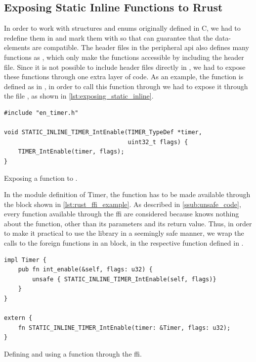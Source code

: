 \subsection{Exposing Static Inline Functions to Rrust}

In order to work with structures and enums originally defined in C, we had to redefine them in {\rust} and mark them with \attrib{\#[repr(C)]} so that {\rust} can guarantee that the data-elements are {\C} compatible.
The header files in the peripheral \gls{api} also defines many functions as , which only make the functions accessible by including the header file.
Since it is not possible to include {\C} header files directly in {\rust}, we had to expose these functions through one extra layer of {\C} code.
As an example, the  function is defined as  in , in order to call this function through {\rust} we had to expose it through the file , as shown in \autoref{lst:exposing_static_inline}.

\begin{listing}[h]
\begin{verbatim}
#include "en_timer.h"

void STATIC_INLINE_TIMER_IntEnable(TIMER_TypeDef *timer,
                                   uint32_t flags) {
    TIMER_IntEnable(timer, flags);
}
\end{verbatim}
\caption{Exposing a  function to {\rust}.}
\label{lst:exposing_static_inline}
\end{listing}

In the {\rust} module definition of Timer, the function has to be made available through the  block shown in \autoref{lst:rust_ffi_example}.
As described in \autoref{ssub:unsafe_code}, every function available through the \gls{ffi} are considered {\unsafe} because {\rust} knows nothing about the function, other than its parameters and its return value.
Thus, in order to make it practical to use the library in a seemingly safe manner, we wrap the calls to the foreign functions in an {\unsafe} block, in the respective function defined in {\rust}.

\begin{listing}[h]
\begin{verbatim}
impl Timer {
    pub fn int_enable(&self, flags: u32) {
        unsafe { STATIC_INLINE_TIMER_IntEnable(self, flags)}
    }
}

extern {
    fn STATIC_INLINE_TIMER_IntEnable(timer: &Timer, flags: u32);
}
\end{verbatim}
\caption{Defining and using a function through the {\rust} \gls{ffi}.}
\label{lst:rust_ffi_example}
\end{listing}

